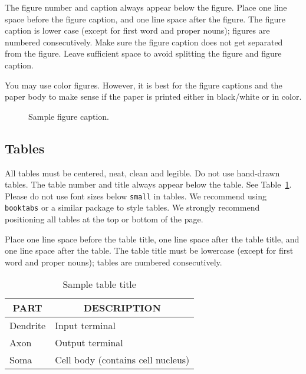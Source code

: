 \documentclass{article} %
\begin{document}
The figure number and caption always appear below the figure. Place one line space before the figure caption, and one line space after the figure. The figure caption is lower case (except for first word and proper nouns); figures are numbered consecutively.
Make sure the figure caption does not get separated from the figure.
Leave sufficient space to avoid splitting the figure and figure caption.

You may use color figures.
However, it is best for the
figure captions and the paper body to make sense if the paper is printed
either in black/white or in color.
\begin{figure}[t]
\begin{center}
\fbox{\rule[-.5cm]{0cm}{4cm} \rule[-.5cm]{4cm}{0cm}}
\end{center}
\caption{Sample figure caption.}
\end{figure}

\subsection{Tables}

All tables must be centered, neat, clean and legible. Do not use hand-drawn tables. The table number and title always appear below the table. See Table~\ref{sample-table}. Please do not use font sizes below {\tt small} in tables. We recommend using {\tt booktabs} or a similar package to style tables. 
We strongly recommend positioning all tables at the top or bottom of the page.

Place one line space before the table title, one line space after the table title, and one line space after the table. The table title must be lowercase (except for first word and proper nouns); tables are numbered consecutively.

\begin{table}[t]
\begin{center}
\begin{tabular}{ll}
\toprule
\multicolumn{1}{c}{\bf PART}  &\multicolumn{1}{c}{\bf DESCRIPTION} \\
\midrule
Dendrite         &Input terminal \\
Axon             &Output terminal \\
Soma             &Cell body (contains cell nucleus) \\
\bottomrule
\end{tabular}
\end{center}
\caption{Sample table title}\label{sample-table}
\end{table}
\end{document}
